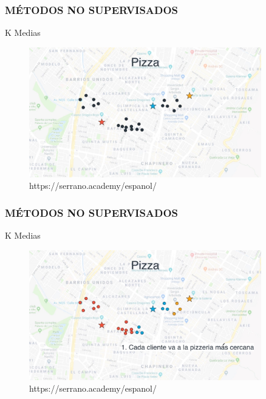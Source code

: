 \documentclass{beamer}
\begin{document}
\begin{frame}
	\frametitle{MÉTODOS NO SUPERVISADOS}
	\begin{block}{K Medias}	
		\begin{figure}
			\includegraphics[width=0.9\textwidth]{Imagenes_k_means/IMG_3509.jpg}
			\caption{https://serrano.academy/espanol/}
		\end{figure}
	\end{block}
\end{frame}

\begin{frame}
	\frametitle{MÉTODOS NO SUPERVISADOS}
	\begin{block}{K Medias}	
		\begin{figure}
			\includegraphics[width=0.9\textwidth]{Imagenes_k_means/IMG_3510.jpg}
			\caption{https://serrano.academy/espanol/}
		\end{figure}
	\end{block}
\end{frame}
\end{document}
